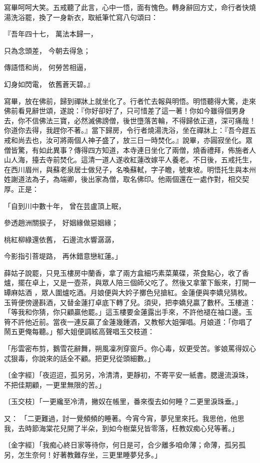 \begin{showcontents}{}
寫畢呵呵大笑。五戒聽了此言，心中一悟，面有愧色。轉身辭回方丈，命行者快燒湯洗浴罷，換了一身新衣，取紙筆忙寫八句頌曰：

『吾年四十七，  萬法本歸一，

只為念頭差，  今朝去得急；

傳語悟和尚，  何勞苦相逼，

幻身如閃電，  依舊蒼天碧。』

寫畢，放在佛前，歸到禪牀上就坐化了。行者忙去報與明悟。明悟聽得大驚，走來佛前看見辭世頌，遂說：『你好卻好了，只可惜差了這一著！你如今雖得個男身去，你不信佛法三寶，必然滅佛謗僧，後世墮落苦輪，不得歸依正道，深可痛哉！你道你去得，我趕你不著。』當下歸房，令行者燒湯洗浴，坐在禪牀上：『吾今趕五戒和尚去也，汝可將兩個人神子盛了，放三日一時焚化。』說畢，亦圓寂坐化。眾僧皆驚，有如此異事？傳得四方知道，本寺連日坐化了兩僧，燒香禮拜，佈施者人山人海，擡去寺前焚化。這清一道人遂收紅蓮改嫁平人養老。不日後，五戒托生，在西川眉州，與蘇老泉居士做兒子，名喚蘇軾，字子瞻，號東坡。明悟托生與本州姓謝道法為子，為端卿，後出家為僧，取名佛印。他兩個還在一處作對，相交契厚。正是：

「自到川中數十年，  曾在芸盧頂上眠，

參透趙洲關捩子，  好姻緣做惡姻緣；

桃紅柳綠還依舊，  石邊流水響潺潺，

今影指引菩堤路，  再休錯意戀紅蓮。」

薛姑子說罷，只見玉樓房中蘭香，拿了兩方盒細巧素菜菓碟，茶食點心，收了香爐，擺在卓上，又是一壺茶，與眾人陪三個師父吃了。然後又拿葷下飯來，打開一罈麻姑酒 ，眾人圍爐吃酒。月娘便與大妗子擲色兒搶紅。金蓮便與李嬌兒猜枚。玉筲便傍邊斟酒，又替金蓮打卓底下轉了兒。須臾，把李嬌兒贏了數杯。玉樓道：「等我和你猜，你只顧贏他罷。」這玉樓要金蓮露出手來，不許他褪在袖口邊。玉筲不許他近前。當夜一連反贏了金蓮幾鍾酒，又教郁大姐彈唱。月娘道：「你唱了鬧五更俺每聽。」郁大姐便調絃高聲唱玉交枝道：

「彤雲密布剪，鵝雪花辭舞，朔風凜冽穿窗戶。你心毒，奴更受苦。爹娘罵得奴心忒狠毒，你說來的話全不顧。把更兒從頭細數。」

〔金字經〕「夜迢迢，孤另另，冷清清，更靜初，不寄平安一紙書。腮邊流淚珠，不把佳期顧，一更里無限的苦。」

〔玉交枝〕「一更纔至冷清，撇奴在帳里，番來復去如何睡？二更里淚珠垂。」

又：  「二更難過，討一覺頻頻的睡著。今宵今宵，夢兒里來托。我思他，他思我，去時節海棠花兒開了半朵，到如今樹葉兒皆零落，枉教奴痴心兒等著。」

〔金字經〕「我痴心終日家等待你，何日是可，合少離多咱命薄；命薄，孤另孤另，怎生奈何！好著教難存坐，三更里睡夢兒多。」


\end{showcontents}
